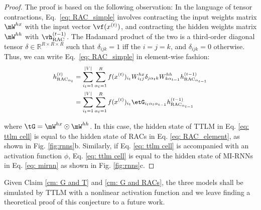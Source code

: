 \begin{proof} The proof is based on the following observation:
%
In the language of tensor contractions, Eq.\ \ref{eq: RAC_simple} involves contracting the input weights matrix  $\mW^{hx}$ with the input vector $\vf (x^{(t)})$, and contracting the hidden weights matrix $\mW^{hh}$ with $\vh^{(t-1)}_\textrm{RAC}$. The Hadamard product of the two is a third-order diagonal tensor $\delta \in \mathbb{R}^{R \times R \times R}$ such that $\delta_{ijk} = 1$ if{f} the $i = j = k$, and $\delta_{ijk} = 0$ otherwise. Thus, we can write Eq.\ \ref{eq: RAC_simple} in element-wise fashion: 
%
\begin{equation} \small
\begin{split}
    \label{eq: RAC_element}
    h^{(t)}_{\textrm{RAC}_{\alpha_t}}
    & = \sum_{{i_t = 1}}^{|V|} \sum_{{\alpha_t = 1}}^{R} f(x^{(t)})_{i_t}W^{hx}_{i_tj}\mathbf{\delta}_{j\alpha_{t}k}W^{hh}_{k\alpha_{t-1}} h^{(t-1)}_{\textrm{RAC}_{\alpha_{t-1}}} \\
    & = \sum_{{i_t = 1}}^{|V|} \sum_{{\alpha_t = 1}}^{R} f(x^{(t)})_{i_t}\etG_{i_t\alpha_{t}\alpha_{t-1}} h^{(t-1)}_{\textrm{RAC}_{\alpha_{t-1}}} \\
\end{split}
\end{equation}


where $\tG = \mW^{hx} \odot \mW^{hh}$. In this case, the hidden state of TTLM in Eq. \ref{eq: ttlm cell} is equal to the hidden state of RACs in Eq. \ref{eq: RAC_element},  as shown in Fig. \ref{fig:rnns}b.  Similarly,  if Eq. \ref{eq: ttlm cell} is accompanied with an activation function $\phi$,  Eq. \ref{eq: ttlm cell}  is equal to the hidden state of MI-RNNs in Eq. \ref{eq: mirnn} as shown in Fig. \ref{fig:rnns}c. 

\end{proof}

Given Claim \ref{cm: G and T} and \ref{cm: G and RACs}, the three models shall be simulated by TTLM with a nonlinear activation function and we leave finding a theoretical proof of this conjecture to a future work.



